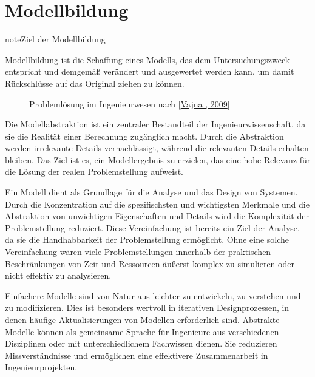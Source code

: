 \documentclass[letterpaper,10pt,german]{jupyterBook}
\let\sphinxpxdimen\pdfpxdimen\else\newdimen\sphinxpxdimen
\begin{document}
\section{Modellbildung}
\label{\detokenize{chapters/chapter1/Einf_xfchrung_Konstruktion:modellbildung}}
\begin{sphinxadmonition}{note}{Ziel der Modellbildung}

\sphinxAtStartPar
Modellbildung ist die Schaffung eines Modells, das dem Untersuchungszweck entspricht und demgemäß verändert und ausgewertet werden kann, um damit Rückschlüsse auf das Original ziehen zu können.
\end{sphinxadmonition}

\begin{figure}[htbp]
\centering
\capstart

\noindent\sphinxincludegraphics[height=300\sphinxpxdimen]{{Problemloesung}.png}
\caption{Problemlösung im Ingenieurwesen nach {[}\hyperlink{cite.quellen:id16}{Vajna , 2009}{]}}\label{\detokenize{chapters/chapter1/Einf_xfchrung_Konstruktion:problemlosung}}\end{figure}

\sphinxAtStartPar
Die Modellabstraktion ist ein zentraler Bestandteil der Ingenieurwissenschaft, da sie die Realität einer Berechnung zugänglich macht. Durch die Abstraktion werden irrelevante Details vernachlässigt, während die relevanten Details erhalten bleiben. Das Ziel ist es, ein Modellergebnis zu erzielen, das eine hohe Relevanz für die Lösung der realen Problemstellung aufweist.

\sphinxAtStartPar
{}

\sphinxAtStartPar
Ein Modell dient als Grundlage für die Analyse und das Design von Systemen. Durch die Konzentration auf die spezifischsten und wichtigsten Merkmale und die Abstraktion von unwichtigen Eigenschaften und Details wird die Komplexität der Problemstellung reduziert. Diese Vereinfachung ist bereits ein Ziel der Analyse, da sie die Handhabbarkeit der Problemstellung ermöglicht. Ohne eine solche Vereinfachung wären viele Problemstellungen innerhalb der praktischen Beschränkungen von Zeit und Ressourcen äußerst komplex zu simulieren oder nicht effektiv zu analysieren.

\sphinxAtStartPar
{}

\sphinxAtStartPar
Einfachere Modelle sind von Natur aus leichter zu entwickeln, zu verstehen und zu modifizieren. Dies ist besonders wertvoll in iterativen Designprozessen, in denen häufige Aktualisierungen von Modellen erforderlich sind. Abstrakte Modelle können als gemeinsame Sprache für Ingenieure aus verschiedenen Disziplinen oder mit unterschiedlichem Fachwissen dienen. Sie reduzieren Missverständnisse und ermöglichen eine effektivere Zusammenarbeit in Ingenieurprojekten.
\end{document}

